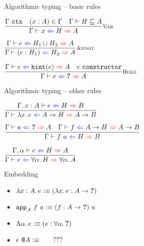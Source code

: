 \documentclass{beamer}
\begin{document}
\begin{frame}{Algorithmic typing -- basic rules}

\begin{center}
  $\infrule[Var]{\tyctx{\Gamma} \quad \sidecond{(x : A) \in \Gamma} \quad \sidecond{\hintorderinctx{H}{A}}}{\hinting{x}{H}{A}}$

  \vspace{2em}

  $\infrule[Annot]{\hinting{e}{\hintlub{H_1}{H_2}}{A}}{\hinting{\annot{e}{H_1}}{H_2}{A}}$

  \vspace{2em}

  $\infrule[Hole]{\hinting{e}{\hintfor{e}}{A} \quad \sidecond{e\ \texttt{constructor}}}{\hinting{e}{\Hole}{A}}$
\end{center}

\end{frame}

\begin{frame}{Algorithmic typing -- other rules}

\begin{center}
  $\infrule{\fullhinting{\extend{\Gamma}{x}{A}}{e}{H}{B}}{\hinting{\fun{x}{e}}{\Fun{A}{H}}{\Fun{A}{B}}}$

  \vspace{2em}

  $\infrule{\hinting{a}{\Hole}{A} \quad \hinting{f}{\Fun{A}{H}}{\Fun{A}{B}}}{\hinting{\app{f}{a}}{H}{B}}$

  \vspace{2em}

  $\infrule{\fullhinting{\extendtype{\Gamma}{\alpha}}{e}{H}{A}}{\hinting{e}{\ForallT{\alpha}{H}}{\ForallT{\alpha}{A}}}$
\end{center}

\end{frame}

\begin{frame}{Embedding}

\begin{itemize}
  \item $\lambda x : A.\, e :\equiv (\lambda x.\, e : A \to \textbf{?})$ \\
  \item $\texttt{app}_{A}\ f\ a :\equiv (f : A \to \textbf{?})\ a$
  \item $\Lambda \alpha.\, e :\equiv (e : \forall \alpha.\, \textbf{?})$
  \item $e\ \texttt{@}A :\equiv \qquad ???$
\end{itemize}

\end{frame}
\end{document}
